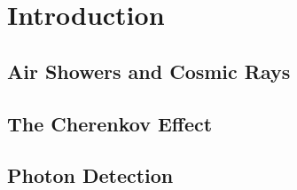 \chapter{Introduction}



\section{Air Showers and Cosmic Rays}

\section{The Cherenkov Effect}

\section{Photon Detection}